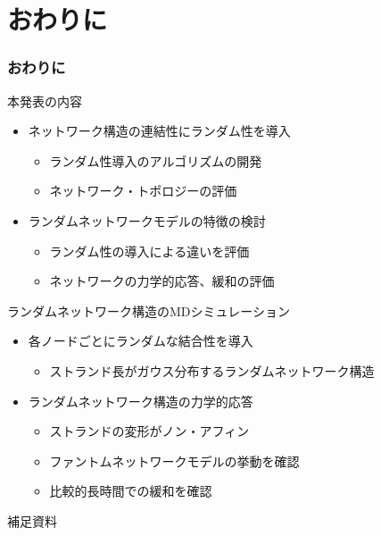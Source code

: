 \documentclass[11pt, dvipdfmx]{beamer}
\begin{document}
\section{おわりに}
\begin{frame}
\frametitle{おわりに}
\vspace{-2mm}
\begin{block}{本発表の内容}
\begin{itemize}
\item
ネットワーク構造の連結性にランダム性を導入
\large
	\begin{itemize}
	\item
	ランダム性導入のアルゴリズムの開発
	\item
	ネットワーク・トポロジーの評価
	\end{itemize}
\item
ランダムネットワークモデルの特徴の検討
\large
	\begin{itemize}
	\item
	ランダム性の導入による違いを評価
	\item
	ネットワークの力学的応答、緩和の評価
	\end{itemize}
\end{itemize}
\end{block}

\begin{alertblock}{ランダムネットワーク構造のMDシミュレーション}
\begin{itemize}
\item
各ノードごとにランダムな結合性を導入
	\begin{itemize}
	\item
	ストランド長がガウス分布するランダムネットワーク構造
	\end{itemize}
\item
ランダムネットワーク構造の力学的応答
	\begin{itemize}
	\item
	ストランドの変形がノン・アフィン
	\item
	ファントムネットワークモデルの挙動を確認
	\item 
	比較的長時間での緩和を確認
	\end{itemize}
\end{itemize}
\end{alertblock}

\end{frame}


\appendix
\begin{frame}
\LARGE{補足資料}
\end{frame}
\end{document}
